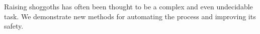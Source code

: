 Raising shoggoths has often been thought to be a complex
and even undecidable task. We demonstrate new methods for
automating the process and improving its safety.
